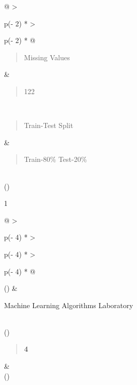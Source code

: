 \documentclass[
]{article}
\begin{document}
\begin{longtable}[]{@{}
  >{\raggedright\arraybackslash}p{(\columnwidth - 2\tabcolsep) * }
  >{\raggedright\arraybackslash}p{(\columnwidth - 2\tabcolsep) * }@{}}
\begin{minipage}[t]{\linewidth}
\begin{quote}
Missing Values
\end{quote}
\end{minipage} & \begin{minipage}[t]{\linewidth}\raggedright
\begin{quote}
122
\end{quote}
\end{minipage} \\
\begin{minipage}[t]{\linewidth}\raggedright
\begin{quote}
Train-Test Split
\end{quote}
\end{minipage} & \begin{minipage}[t]{\linewidth}\raggedright
\begin{quote}
Train-80\% Test-20\%
\end{quote}
\end{minipage} \\
\bottomrule()
\end{longtable}

1

\begin{longtable}[]{@{}
  >{\raggedright\arraybackslash}p{(\columnwidth - 4\tabcolsep) * }
  >{\raggedright\arraybackslash}p{(\columnwidth - 4\tabcolsep) * }
  >{\raggedright\arraybackslash}p{(\columnwidth - 4\tabcolsep) * }@{}}
\toprule()
 & \begin{minipage}[b]{\linewidth}\raggedright
Machine Learning Algorithms Laboratory
\end{minipage} \\
\midrule()
\endhead
\begin{minipage}[t]{\linewidth}\raggedright
\begin{quote}
\textbf{4}
\end{quote}
\end{minipage} &
 \\
\bottomrule()
\end{longtable}
\end{document}
